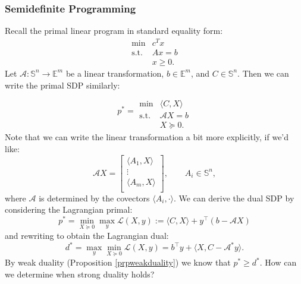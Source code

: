 \documentclass[11pt]{article}
\numberwithin{equation}{section}
\theoremstyle{definition}
\newcommand{\bE}{\mathbb{E}}
\newcommand{\bS}{\mathbb{S}}
\newcommand{\cA}{\mathcal{A}}
\newcommand{\cL}{\mathcal{L}}
\newcommand{\tst}{\text{s.t.}}
\begin{document}
\subsubsection{Semidefinite Programming}
Recall the primal linear program in standard equality form:
\begin{equation}
    \begin{array}{cc}
         \min &c^Tx  \\
         \tst & Ax=b\\
              & x\ge 0.
    \end{array}
\end{equation}
Let $\cA:\bS^n\to\bE^m$ be a linear transformation, $b\in\bE^m$, and $C\in\bS^n$. Then we can write the primal SDP similarly:
\vspace{-2\baselineskip}
\begin{equation}
    p^*=\begin{array}{cc}
    &\\&\\
         \min & \langle C, X\rangle  \\
         \tst & \cA X=b\\
              & X\succeq 0.
    \end{array}
\end{equation}
Note that we can write the linear transformation a bit more explicitly, if we'd like:
\begin{equation}
    \cA X=\begin{bmatrix}
        \langle A_1, X\rangle\\
        \vdots\\
        \langle A_m, X\rangle\\
    \end{bmatrix},\qquad A_i\in\bS^n,
\end{equation}
where $\cA$ is determined by the covectors $\langle A_i, \cdot\rangle$. We can derive the dual SDP by considering the Lagrangian primal:
\begin{equation}
    p^*=\min_{X\succeq 0}\max_y\cL(X,y):=\langle C,X\rangle+y^\top(b-\cA X)
\end{equation}
and rewriting to obtain the Lagrangian dual:
\begin{equation}
    d^*=\max_y\min_{X\succeq 0}\cL(X,y)=b^\top y+\langle X, C-\cA^*y\rangle.
\end{equation}
By weak duality (Proposition \ref{prpweakduality}) we know that $p^*\ge d^*$. How can we determine when strong duality holds?
\end{document}
